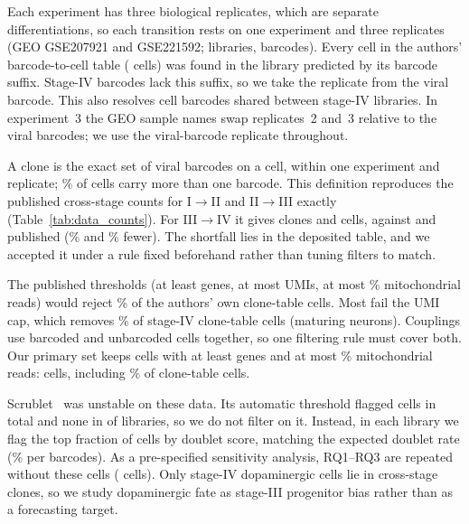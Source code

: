 \documentclass[10pt,journal,compsoc]{IEEEtran}
\begin{document}
Each experiment has three biological replicates, which are separate differentiations, so
each transition rests on one experiment and three replicates (GEO GSE207921 and GSE221592;
\nLibraries{} libraries,
\nBarcodes{} barcodes). Every cell in the authors' barcode-to-cell table
(\nCloneTableCells{} cells) was found in the library predicted by its barcode suffix.
Stage-IV barcodes lack this suffix, so we take the replicate from the viral barcode. This
also resolves \nStageIVCollisions{} cell barcodes shared between stage-IV libraries. In
experiment~3 the GEO sample names swap replicates~2 and~3 relative to the viral barcodes;
we use the viral-barcode replicate throughout.

A clone is the exact set of viral barcodes on a cell, within one experiment and replicate;
\pctMultiBarcode\% of cells carry more than one barcode. This definition reproduces the
published cross-stage counts for I$\to$II and II$\to$III exactly (Table~\ref{tab:data_counts}).
For III$\to$IV it gives \nExpThreeClones{} clones and \nExpThreeCells{} cells, against
\nExpThreePubClones{} and \nExpThreePubCells{} published (\pctExpThreeCloneGap\% and
\pctExpThreeCellGap\% fewer). The shortfall lies in the deposited table, and we accepted it
under a rule fixed beforehand rather than tuning filters to match.

The published thresholds (at least \minGenes{} genes, at most \umiCap{} UMIs, at most
\maxMt\% mitochondrial reads) would reject \pctCloneTableFailPaperQC\% of the authors' own
clone-table cells. Most fail the UMI cap, which removes \pctStageIVOverUMICap\% of stage-IV
clone-table cells (maturing neurons). Couplings use barcoded and unbarcoded cells together,
so one filtering rule must cover both. Our primary set keeps cells with at least
\minGenes{} genes and at most \maxMt\% mitochondrial reads: \nPrimaryCells{} cells,
including \pctCloneTableKept\% of clone-table cells.

Scrublet~\cite{Wolock_2019} was unstable on these data. Its automatic threshold flagged
\nScrubletAutoTotal{} cells in total and none in \nLibsScrubletZero{} of \nLibraries{}
libraries, so we do not filter on it. Instead, in each library we flag the top fraction of
cells by doublet score, matching the expected doublet rate (\dblRatePct\% per \dblRatePer{}
barcodes). As a pre-specified sensitivity analysis, RQ1--RQ3 are repeated without these
cells (\nSensitivityCells{} cells). Only \nDACellsCrossStage{} stage-IV dopaminergic cells
lie in cross-stage clones, so we study dopaminergic fate as stage-III progenitor bias rather
than as a forecasting target.
\end{document}
